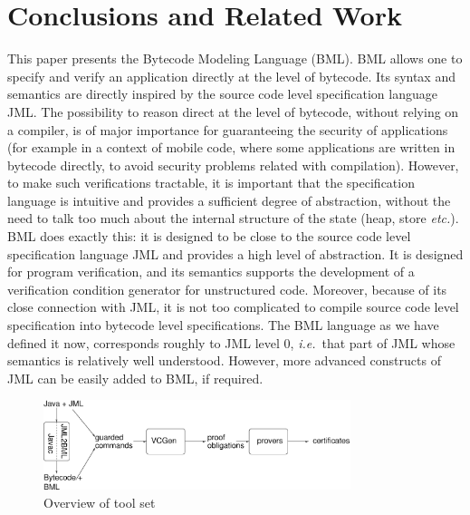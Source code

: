 \section{Conclusions and Related Work}\label{SecConcl}

This paper presents the Bytecode Modeling Language (BML). BML allows
one to specify and verify an application directly at the level of
bytecode. Its syntax and semantics are directly inspired by the source
code level specification language JML.  The possibility to reason
direct at the level of bytecode, without relying on a compiler, is of
major importance for guaranteeing the security of applications (for
example in a context of mobile code, where some applications are
written in bytecode directly, to avoid security problems related with
compilation). However, to make such verifications tractable, it is
important that the specification language is intuitive and provides a
sufficient degree of abstraction, without the need to talk too much
about the internal structure of the state (heap, store
\emph{etc.}). BML does exactly this: it is designed to be close to the
source code level specification language JML and provides a high level
of abstraction. It is designed for program verification, and its
semantics supports the development of a verification condition
generator for unstructured code. Moreover, because of its close
connection with JML, it is not too complicated to compile source code
level specification into bytecode level specifications.  The BML
language as we have defined it now, corresponds roughly to JML level
0, \emph{i.e.}\ that part of JML whose semantics is relatively well
understood. However, more advanced constructs of JML can be easily
added to BML, if required.

\begin{figure}[t]
\begin{center}
\includegraphics[width=0.8\textwidth]{toolset.eps} 
\vspace*{-1em}
\caption{Overview of \mobius tool set}\label{FigToolSet}
\end{center}
\end{figure}
